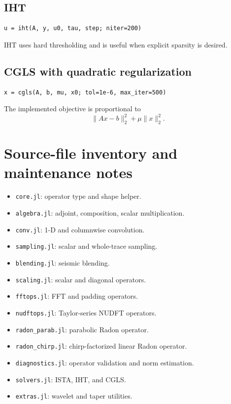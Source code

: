 \documentclass[11pt]{article}
\begin{document}
\subsection{IHT}
\begin{verbatim}
u = iht(A, y, u0, tau, step; niter=200)
\end{verbatim}
IHT uses hard thresholding and is useful when explicit sparsity is desired.

\subsection{CGLS with quadratic regularization}
\begin{verbatim}
x = cgls(A, b, mu, x0; tol=1e-6, max_iter=500)
\end{verbatim}
The implemented objective is proportional to
\[
   \|Ax-b\|_2^2 + \mu\|x\|_2^2.
\]

\section{Source-file inventory and maintenance notes}
\begin{itemize}
  \item \texttt{core.jl}: operator type and shape helper.
  \item \texttt{algebra.jl}: adjoint, composition, scalar multiplication.
  \item \texttt{conv.jl}: 1-D and columnwise convolution.
  \item \texttt{sampling.jl}: scalar and whole-trace sampling.
  \item \texttt{blending.jl}: seismic blending.
  \item \texttt{scaling.jl}: scalar and diagonal operators.
  \item \texttt{fftops.jl}: FFT and padding operators.
  \item \texttt{nudftops.jl}: Taylor-series NUDFT operators.
  \item \texttt{radon\_parab.jl}: parabolic Radon operator.
  \item \texttt{radon\_chirp.jl}: chirp-factorized linear Radon operator.
  \item \texttt{diagnostics.jl}: operator validation and norm estimation.
  \item \texttt{solvers.jl}: ISTA, IHT, and CGLS.
  \item \texttt{extras.jl}: wavelet and taper utilities.
\end{itemize}
\end{document}
